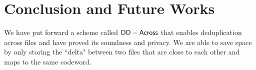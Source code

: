 \chapter{Conclusion and Future Works}
\label{chap:future}

We have put forward a scheme called $\mathsf{DD-Across}$ that enables deduplication across files and have proved its soundness and privacy. We are able to save space by only storing the ``delta" between two files that are close to each other and maps to the same codeword.


